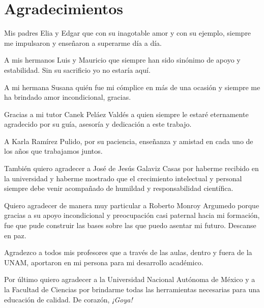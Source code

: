 \chapter*{Agradecimientos}

Mis padres Elia y Edgar que con su inagotable amor y con su ejemplo, siempre me impulsaron y enseñaron a superarme día a día. 

A mis hermanos Luis y Mauricio que siempre han sido sinónimo de apoyo y estabilidad. Sin su sacrificio yo no estaría aquí. 

A mi hermana Susana quién fue mi cómplice en más de una ocasión y siempre me ha brindado amor incondicional, gracias.

Gracias a mi tutor Canek Peláez Valdés a quien siempre le estaré eternamente agradecido por su guía, asesoría y dedicación a este trabajo. 

A Karla Ramírez Pulido, por su paciencia, enseñanza y amistad en cada uno de los años que trabajamos juntos. 

También quiero agradecer a José de Jesús Galaviz Casas por haberme recibido en la universidad y haberme  mostrado que el crecimiento intelectual y personal siempre debe venir acompañado de humildad y responsabilidad científica. 

Quiero agradecer de manera muy particular a Roberto Monroy Argumedo porque gracias a su apoyo incondicional y preocupación casi paternal hacia mi formación, fue que pude construir las bases sobre  las que puedo asentar mi futuro. Descanse en paz. 

Agradezco a todos mis profesores que a través de las aulas, dentro y fuera de la UNAM, aportaron en mi persona para mi desarrollo académico. 

Por último quiero agradecer a la Universidad Nacional Autónoma de México y a la Facultad de Ciencias por brindarme todas las herramientas necesarias para una educación de calidad. De corazón, \textit{¡Goya!}

\newpage
\clearpage